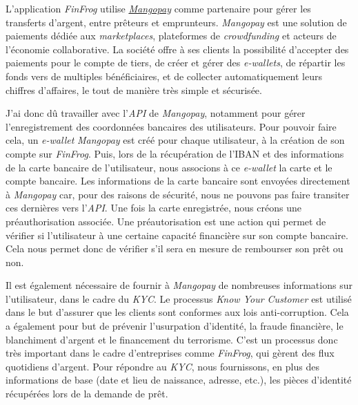 \documentclass[12pt,a4paper]{article}
\begin{document}
  L'application \emph{FinFrog} utilise
  \href{https://www.mangopay.com/fr/}{\emph{Mangopay}} comme partenaire
  pour gérer les transferts d'argent, entre prêteurs et emprunteurs.
  \emph{Mangopay} est une solution de paiements dédiée aux
  \emph{marketplaces}, plateformes de \emph{crowdfunding} et acteurs de
  l'économie collaborative. La société offre à ses clients la possibilité
  d'accepter des paiements pour le compte de tiers, de créer et gérer des
  \emph{e-wallets}, de répartir les fonds vers de multiples bénéficiaires,
  et de collecter automatiquement leurs chiffres d'affaires, le tout de
  manière très simple et sécurisée.

  \bigskip

  J'ai donc dû travailler avec l'\emph{API} de \emph{Mangopay}, notamment
  pour gérer l'enregistrement des coordonnées bancaires des utilisateurs.
  Pour pouvoir faire cela, un \emph{e-wallet} \emph{Mangopay} est créé
  pour chaque utilisateur, à la création de son compte sur \emph{FinFrog}.
  Puis, lors de la récupération de l'IBAN et des informations de la carte
  bancaire de l'utilisateur, nous associons à ce \emph{e-wallet} la carte
  et le compte bancaire. Les informations de la carte bancaire sont
  envoyées directement à \emph{Mangopay} car, pour des raisons de
  sécurité, nous ne pouvons pas faire transiter ces dernières vers
  l'\emph{API}. Une fois la carte enregistrée, nous créons une
  préauthorisation associée. Une préautorisation est une action qui permet
  de vérifier si l'utilisateur à une certaine capacité financière sur son
  compte bancaire. Cela nous permet donc de vérifier s'il sera en mesure
  de rembourser son prêt ou non.

  \bigskip

  Il est également nécessaire de fournir à \emph{Mangopay} de nombreuses
  informations sur l'utilisateur, dans le cadre du \emph{KYC}. Le
  processus \emph{Know Your Customer} est utilisé dans le but d'assurer
  que les clients sont conformes aux lois anti-corruption. Cela a
  également pour but de prévenir l'usurpation d'identité, la fraude
  financière, le blanchiment d'argent et le financement du terrorisme.
  C'est un processus donc très important dans le cadre d'entreprises comme
  \emph{FinFrog}, qui gèrent des flux quotidiens d'argent. Pour répondre
  au \emph{KYC}, nous fournissons, en plus des informations de base (date
  et lieu de naissance, adresse, etc.), les pièces d'identité récupérées
  lors de la demande de prêt.

  \bigskip
\end{document}
